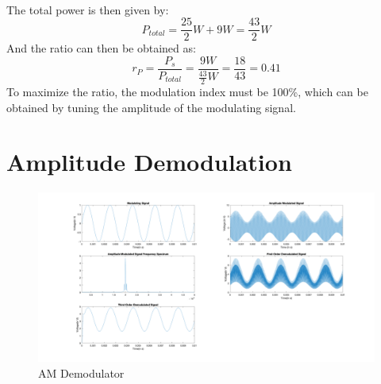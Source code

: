 \begin{enumerate}
\begin{equation}
\begin{gathered}
              \end{gathered}
          \end{equation}
          The total power is then given by:
          \begin{equation}
              P_{total} = \frac{25}{2}W + 9W = \frac{43}{2}W
          \end{equation}
          And the ratio can then be obtained as:
          \begin{equation}
              r_P = \frac{P_s}{P_{total}} = \frac{9W}{\frac{43}{2}W} = \frac{18}{43} = 0.41
          \end{equation}
          To maximize the ratio, the modulation index must be 100\%, which can be obtained by tuning the amplitude of the modulating signal.
\end{enumerate}
\newpage
\section{Amplitude Demodulation}
\begin{figure}[H]
    \centering
    \includegraphics[width=1\textwidth]{images/prelab_problem2.png}
    \caption{AM Demodulator}
    \label{fig:AM_Demodulator}
\end{figure}

